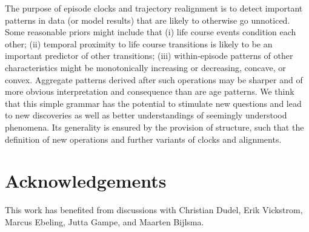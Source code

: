 \documentclass{article}
\begin{document}
The purpose of episode clocks and trajectory realignment is to detect important patterns in data (or model results) that are likely to otherwise go unnoticed. Some reasonable priors might include that (i) life course events condition each other; (ii) temporal proximity to life course transitions is likely to be an important predictor of other transitions; (iii) within-episode patterns of other characteristics might be monotonically increasing or decreasing, concave, or convex. Aggregate patterns derived after such operations may be sharper and of more obvious interpretation and consequence than are age patterns. We think that this simple grammar has the potential to stimulate new questions and lead to new discoveries as well as better understandings of seemingly understood phenomena. Its generality is ensured by the provision of structure, such that the definition of new operations and further variants of clocks and alignments.


\section*{Acknowledgements}
This work has benefited from discussions with Christian Dudel, Erik Vickstrom, Marcus Ebeling, Jutta Gampe, and Maarten Bijlsma. 

\FloatBarrier
\singlespacing

   
\end{document}
